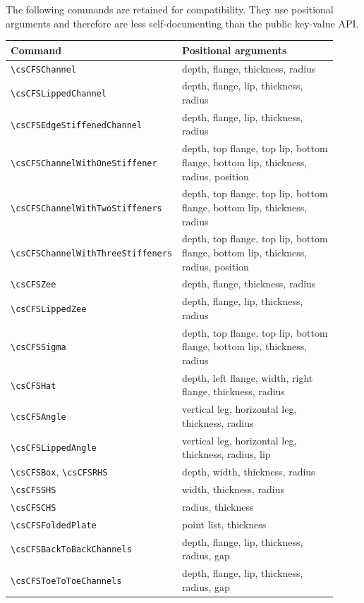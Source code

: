 \documentclass[10pt]{article}
\newcommand{\smallcommand}[1]{{\scriptsize\texttt{\textbackslash #1}}}
\begin{document}
The following commands are retained for compatibility. They use positional
arguments and therefore are less self-documenting than the public key-value API.

\begin{footnotesize}
\begin{longtable}{@{}L{0.39\linewidth}L{0.53\linewidth}@{}}
\toprule
Command & Positional arguments \\
\midrule
\smallcommand{csCFSChannel} & depth, flange, thickness, radius \\
\smallcommand{csCFSLippedChannel} & depth, flange, lip, thickness, radius \\
\smallcommand{csCFSEdgeStiffenedChannel} & depth, flange, lip, thickness, radius \\
\smallcommand{csCFSChannelWithOneStiffener} & depth, top flange, top lip, bottom flange, bottom lip, thickness, radius, position \\
\smallcommand{csCFSChannelWithTwoStiffeners} & depth, top flange, top lip, bottom flange, bottom lip, thickness, radius \\
\smallcommand{csCFSChannelWithThreeStiffeners} & depth, top flange, top lip, bottom flange, bottom lip, thickness, radius, position \\
\smallcommand{csCFSZee} & depth, flange, thickness, radius \\
\smallcommand{csCFSLippedZee} & depth, flange, lip, thickness, radius \\
\smallcommand{csCFSSigma} & depth, top flange, top lip, bottom flange, bottom lip, thickness, radius \\
\smallcommand{csCFSHat} & depth, left flange, width, right flange, thickness, radius \\
\smallcommand{csCFSAngle} & vertical leg, horizontal leg, thickness, radius \\
\smallcommand{csCFSLippedAngle} & vertical leg, horizontal leg, thickness, radius, lip \\
\smallcommand{csCFSBox}, \smallcommand{csCFSRHS} & depth, width, thickness, radius \\
\smallcommand{csCFSSHS} & width, thickness, radius \\
\smallcommand{csCFSCHS} & radius, thickness \\
\smallcommand{csCFSFoldedPlate} & point list, thickness \\
\smallcommand{csCFSBackToBackChannels} & depth, flange, lip, thickness, radius, gap \\
\smallcommand{csCFSToeToToeChannels} & depth, flange, lip, thickness, radius, gap \\

\end{longtable}
\end{footnotesize}
\end{document}
